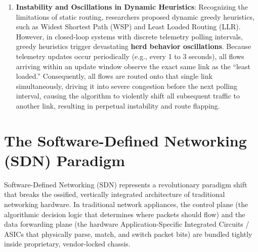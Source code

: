 \documentclass[12pt,a4paper,oneside]{report}
\begin{document}
\begin{enumerate}[label=\textbf{\arabic*.}]
\begin{itemize}
        \item \emph{Hash Polarization}: In multi-stage Clos architectures, identical hashing algorithms implemented across consecutive switch tiers often map the same subset of flows onto identical downstream paths, concentrating traffic onto a fraction of available fabric links.
    \end{itemize}
    \item \textbf{Instability and Oscillations in Dynamic Heuristics}: Recognizing the limitations of static routing, researchers proposed dynamic greedy heuristics, such as Widest Shortest Path (WSP) and Least Loaded Routing (LLR). However, in closed-loop systems with discrete telemetry polling intervals, greedy heuristics trigger devastating \textbf{herd behavior oscillations}. Because telemetry updates occur periodically (e.g., every 1 to 3 seconds), all flows arriving within an update window observe the exact same link as the ``least loaded.'' Consequently, all flows are routed onto that single link simultaneously, driving it into severe congestion before the next polling interval, causing the algorithm to violently shift all subsequent traffic to another link, resulting in perpetual instability and route flapping.
\end{enumerate}

\section{The Software-Defined Networking (SDN) Paradigm}
Software-Defined Networking (SDN) represents a revolutionary paradigm shift that breaks the ossified, vertically integrated architecture of traditional networking hardware. In traditional network appliances, the control plane (the algorithmic decision logic that determines where packets should flow) and the data forwarding plane (the hardware Application-Specific Integrated Circuits / ASICs that physically parse, match, and switch packet bits) are bundled tightly inside proprietary, vendor-locked chassis.
\end{document}

